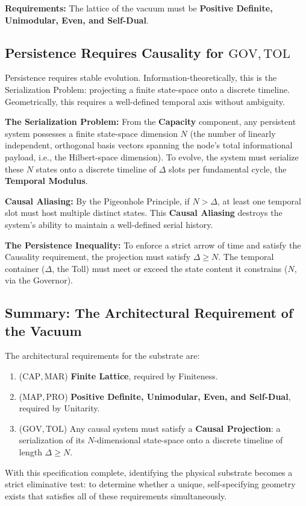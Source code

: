\textbf{Requirements:} The lattice of the vacuum must be \textbf{Positive Definite, Unimodular, Even, and Self-Dual}.

\subsection{Persistence Requires Causality for \texorpdfstring{$\mathrm{GOV}, \mathrm{TOL}$}{GOV, TOL}}
\label{sec:causality}
Persistence requires stable evolution. Information-theoretically, this is the Serialization Problem: projecting a finite state-space onto a discrete timeline. Geometrically, this requires a well-defined temporal axis without ambiguity.

\textbf{The Serialization Problem:} From the \textbf{Capacity} component, any persistent system possesses a finite state-space dimension $N$ (the number of linearly independent, orthogonal basis vectors spanning the node's total informational payload, i.e., the Hilbert-space dimension). To evolve, the system must serialize these $N$ states onto a discrete timeline of $\Delta$ slots per fundamental cycle, the \textbf{Temporal Modulus}.

\textbf{Causal Aliasing:} By the Pigeonhole Principle, if $N > \Delta$, at least one temporal slot must host multiple distinct states. This \textbf{Causal Aliasing} destroys the system's ability to maintain a well-defined serial history.
    
\textbf{The Persistence Inequality:} To enforce a strict arrow of time and satisfy the Causality requirement, the projection must satisfy $\Delta \ge N$. The temporal container ($\Delta$, the Toll) must meet or exceed the state content it constrains ($N$, via the Governor).

\subsection{Summary: The Architectural Requirement of the Vacuum}
The architectural requirements for the substrate are:

\begin{enumerate}
    \item ($\mathrm{CAP}, \mathrm{MAR}$) \textbf{Finite Lattice}, required by Finiteness.
    \item ($\mathrm{MAP}, \mathrm{PRO}$) \textbf{Positive Definite, Unimodular, Even, and Self-Dual}, required by Unitarity. 
    \item ($\mathrm{GOV}, \mathrm{TOL}$) Any causal system must satisfy a \textbf{Causal Projection}: a serialization of its $N$-dimensional state-space onto a discrete timeline of length $\Delta \ge N$.
\end{enumerate}

With this specification complete, identifying the physical substrate becomes a strict eliminative test: to determine whether a unique, self-specifying geometry exists that satisfies all of these requirements simultaneously.